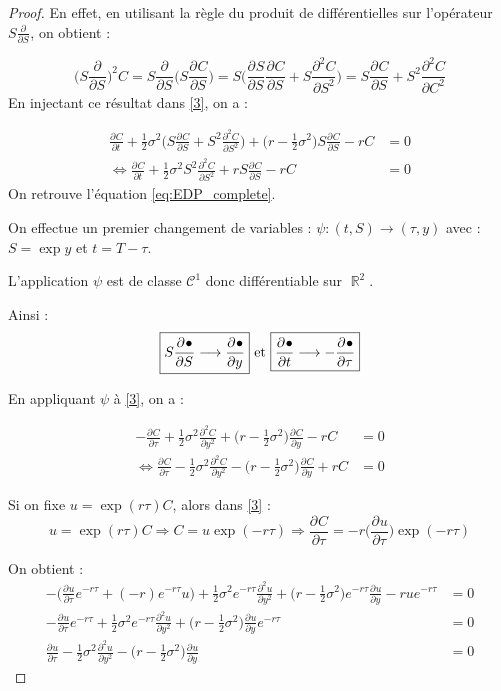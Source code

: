\documentclass[11pt,a4paper]{article}
\newcommand{\deriv}[3][]{%
  \ensuremath{\frac{\partial^{#1} {#2}}{\partial {#3}^{#1}}}}
\theoremstyle{plain}
\DeclareMathOperator{\R}{\mathbb{R}}
\begin{document}
\begin{proof}
En effet, en utilisant la règle du produit de différentielles sur l'opérateur $S\deriv{}{S}$, on obtient :

$$
\Big(S\deriv{}{S}\Big)^2C = S\deriv{}{S}\Big(S\deriv{C}{S}\Big) = S\Big(\deriv{S}{S}\deriv{C}{S} + S\deriv[2]{C}{S}\Big) = S\deriv{C}{S} + S^2\deriv[2]{C}{C}
$$
En injectant ce résultat dans \eqref{3}, on a :

\begin{align*}
    \deriv{C}{t} + \frac{1}{2}\sigma^2\Big(S\deriv{C}{S} + S^2\deriv[2]{C}{S}\Big) + \Big(r - \frac{1}{2}\sigma^2\Big)S\deriv{C}{S} - rC &= 0 \\
    \Longleftrightarrow \deriv{C}{t} + \frac{1}{2}\sigma^2S^2\deriv[2]{C}{S} + rS\deriv{C}{S} - rC &= 0
\end{align*}
On retrouve l'équation \eqref{eq:EDP_complete}. 


On effectue un premier changement de variables : $\psi : (t, S) \longrightarrow (\tau, y)$ avec : $S = \exp y$ et $t = T - \tau$.

L'application $\psi$ est de classe $\mathcal{C}^1$ donc différentiable sur $\R^2$.

Ainsi : 
$$
\boxed{S\deriv{\bullet}{S} \longrightarrow \deriv{\bullet}{y}} \ \text{et} \ \boxed{\deriv{\bullet}{t} \longrightarrow -\deriv{\bullet}{\tau}}
$$

En appliquant $\psi$ à \eqref{3}, on a :



\begin{align*}
    -\deriv{C}{\tau} + \frac{1}{2}\sigma^2\deriv[2]{C}{y} + \Big(r - \frac{1}{2}\sigma^2\Big)\deriv{C}{y} - rC &= 0 \\
    \Longleftrightarrow \deriv{C}{\tau} - \frac{1}{2}\sigma^2\deriv[2]{C}{y} - \Big(r - \frac{1}{2}\sigma^2\Big)\deriv{C}{y} + rC &= 0
\end{align*}

Si on fixe $u = \exp(r\tau)C$, alors dans \eqref{3} :
$$
u = \exp(r\tau)C \Longrightarrow \boxed{C = u\exp(-r\tau) \Longrightarrow \deriv{C}{\tau} = -r\Big(\deriv{u}{\tau}\Big)\exp(-r\tau)}
$$

On obtient :
\begin{align*}
    -\Big(\deriv{u}{\tau}e^{-r\tau} + (-r)e^{-r\tau}u\Big) + \frac{1}{2}\sigma^2 e^{-r\tau}\deriv[2]{u}{y} + \Big(r - \frac{1}{2}\sigma^2\Big)e^{-r\tau}\deriv{u}{y} - rue^{-r\tau} &= 0 \\
    -\deriv{u}{\tau}e^{-r\tau} + \frac{1}{2}\sigma^2e^{-r\tau}\deriv[2]{u}{y} + \Big(r - \frac{1}{2}\sigma^2\Big)\deriv{u}{y}e^{-r\tau} &= 0 \\
    \deriv{u}{\tau} - \frac{1}{2}\sigma^2\deriv[2]{u}{y} - \Big(r - \frac{1}{2}\sigma^2\Big)\deriv{u}{y} &= 0
\end{align*}


\end{proof}
\end{document}

